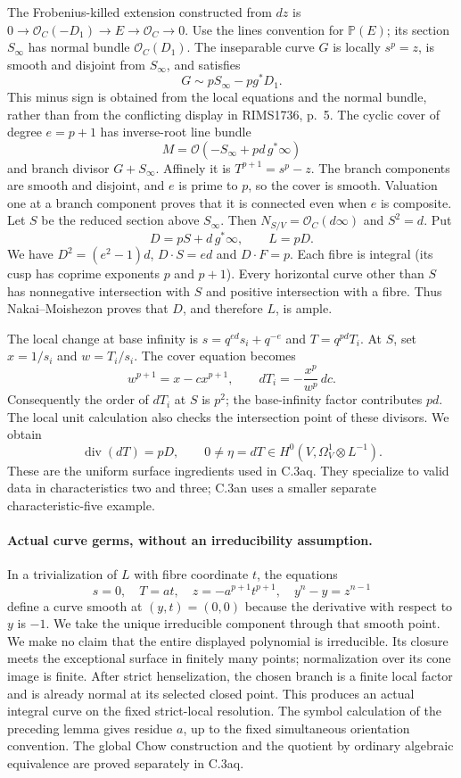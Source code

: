 The Frobenius-killed extension constructed from $dz$ is
$0\to\mathcal O_C(-D_1)\to E\to\mathcal O_C\to0$.
Use the lines convention for $\mathbb P(E)$; its section $S_\infty$
has normal bundle $\mathcal O_C(D_1)$. The inseparable curve $G$ is
locally $s^p=z$, is smooth and disjoint from $S_\infty$, and satisfies
\[
                    G\sim pS_\infty-pg^*D_1.
\]
This minus sign is obtained from the local equations and the normal
bundle, rather than from the conflicting display in RIMS1736, p.~5.
The cyclic cover of degree $e=p+1$ has inverse-root line bundle
\[
                   M=\mathcal O(-S_\infty+pd\,g^*\infty)
\]
and branch divisor $G+S_\infty$. Affinely it is
$T^{p+1}=s^p-z$. The branch components are smooth and disjoint,
and $e$ is prime to $p$, so the cover is smooth. Valuation one at
a branch component proves that it is connected even when $e$ is composite.
Let $S$ be the reduced section above $S_\infty$.
Then $N_{S/V}=\mathcal O_C(d\infty)$ and $S^2=d$.
Put
\[
                     D=pS+d\,g^*\infty,
                     \qquad L=pD.
\]
We have $D^2=(e^2-1)d$, $D\cdot S=ed$ and $D\cdot F=p$.
Each fibre is integral (its cusp has coprime exponents $p$ and $p+1$).
Every horizontal curve other than $S$ has nonnegative intersection with
$S$ and positive intersection with a fibre. Thus Nakai--Moishezon
proves that $D$, and therefore $L$, is ample.

The local change at base infinity is
$s=q^{ed}s_i+q^{-e}$ and $T=q^{pd}T_i$.
At $S$, set $x=1/s_i$ and $w=T_i/s_i$. The cover equation becomes
\[
                         w^{p+1}=x-cx^{p+1},
 \qquad dT_i=-\frac{x^p}{w^p}\,dc.
\]
Consequently the order of $dT_i$ at $S$ is $p^2$; the base-infinity
factor contributes $pd$. The local unit calculation also checks the
intersection point of these divisors. We obtain
\[
                    \operatorname{div}(dT)=pD,
 \qquad 0\ne\eta=dT\in H^0(V,\Omega^1_V\otimes L^{-1}).
\]
These are the uniform surface ingredients used in C.3aq. They specialize
to valid data in characteristics two and three; C.3an uses a smaller
separate characteristic-five example.

\paragraph{Actual curve germs, without an irreducibility assumption.}
In a trivialization of $L$ with fibre coordinate $t$, the equations
\[
 s=0,\quad T=at,\quad z=-a^{p+1}t^{p+1},\quad
 y^n-y=z^{n-1}
\]
define a curve smooth at $(y,t)=(0,0)$ because the derivative with
respect to $y$ is $-1$. We take the unique irreducible component through
that smooth point. We make no claim that the entire displayed
polynomial is irreducible. Its closure meets the exceptional surface
in finitely many points; normalization over its cone image is finite.
After strict henselization, the chosen branch is a finite local factor
and is already normal at its selected closed point. This produces an
actual integral curve on the fixed strict-local resolution. The symbol
calculation of the preceding lemma gives residue $a$, up to the fixed
simultaneous orientation convention. The global Chow construction and
the quotient by ordinary algebraic equivalence are proved separately
in C.3aq.
